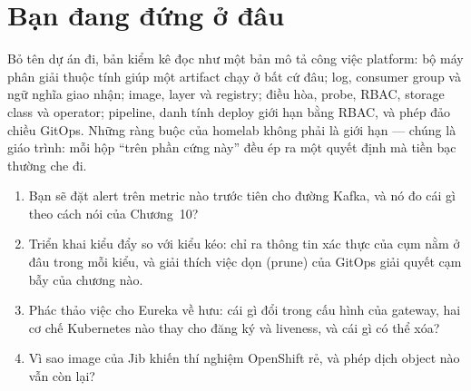 \section{Bạn đang đứng ở đâu}

Bỏ tên dự án đi, bản kiểm kê đọc như một bản mô tả công việc
platform: bộ máy phân giải thuộc tính giúp một artifact chạy ở bất cứ
đâu; log, consumer group và ngữ nghĩa giao nhận; image, layer và
registry; điều hòa, probe, RBAC, storage class và operator; pipeline,
danh tính deploy giới hạn bằng RBAC, và phép đảo chiều GitOps. Những
ràng buộc của homelab không phải là giới hạn --- chúng là giáo trình:
mỗi hộp ``trên phần cứng này'' đều ép ra một quyết định mà tiền bạc
thường che đi.

\begin{quiz}
\begin{enumerate}
  \item Bạn sẽ đặt alert trên metric nào trước tiên cho đường Kafka,
  và nó đo cái gì theo cách nói của Chương~10?
  \item Triển khai kiểu đẩy so với kiểu kéo: chỉ ra thông tin xác thực
  của cụm nằm ở đâu trong mỗi kiểu, và giải thích việc dọn (prune) của
  GitOps giải quyết cạm bẫy của chương nào.
  \item Phác thảo việc cho Eureka về hưu: cái gì đổi trong cấu hình
  của gateway, hai cơ chế Kubernetes nào thay cho đăng ký và liveness,
  và cái gì có thể xóa?
  \item Vì sao image của Jib khiến thí nghiệm OpenShift rẻ, và phép
  dịch object nào vẫn còn lại?
\end{enumerate}
\end{quiz}
